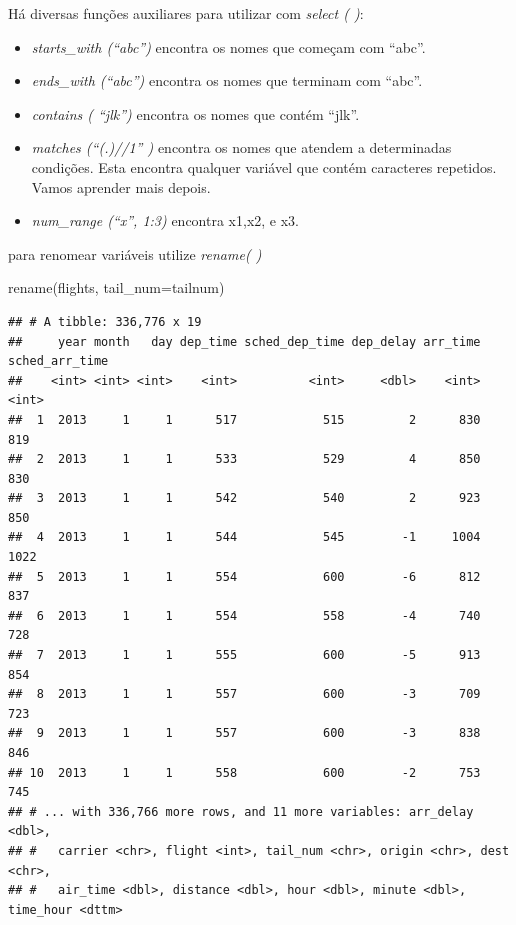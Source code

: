 \documentclass[
]{article}
\newenvironment{Shaded}{\begin{snugshade}}{\end{snugshade}}
\newcommand{\AttributeTok}[1]{\textcolor[rgb]{0.77,0.63,0.00}{#1}}
\newcommand{\FunctionTok}[1]{\textcolor[rgb]{0.00,0.00,0.00}{#1}}
\newcommand{\NormalTok}[1]{#1}
\begin{document}
Há diversas funções auxiliares para utilizar com \emph{select ( )}:

\begin{itemize}
\item
  \emph{starts\_with (``abc'')} encontra os nomes que começam com
  ``abc''.
\item
  \emph{ends\_with (``abc'')} encontra os nomes que terminam com
  ``abc''.
\item
  \emph{contains ( ``jlk'')} encontra os nomes que contém ``jlk''.
\item
  \emph{matches (``(.)//1'' )} encontra os nomes que atendem a
  determinadas condições. Esta encontra qualquer variável que contém
  caracteres repetidos. Vamos aprender mais depois.
\item
  \emph{num\_range (``x'', 1:3)} encontra x1,x2, e x3.
\end{itemize}

para renomear variáveis utilize \emph{rename( )}

\begin{Shaded}
\begin{Highlighting}[]
\FunctionTok{rename}\NormalTok{(flights, }\AttributeTok{tail\_num=}\NormalTok{tailnum)}
\end{Highlighting}
\end{Shaded}

\begin{verbatim}
## # A tibble: 336,776 x 19
##     year month   day dep_time sched_dep_time dep_delay arr_time sched_arr_time
##    <int> <int> <int>    <int>          <int>     <dbl>    <int>          <int>
##  1  2013     1     1      517            515         2      830            819
##  2  2013     1     1      533            529         4      850            830
##  3  2013     1     1      542            540         2      923            850
##  4  2013     1     1      544            545        -1     1004           1022
##  5  2013     1     1      554            600        -6      812            837
##  6  2013     1     1      554            558        -4      740            728
##  7  2013     1     1      555            600        -5      913            854
##  8  2013     1     1      557            600        -3      709            723
##  9  2013     1     1      557            600        -3      838            846
## 10  2013     1     1      558            600        -2      753            745
## # ... with 336,766 more rows, and 11 more variables: arr_delay <dbl>,
## #   carrier <chr>, flight <int>, tail_num <chr>, origin <chr>, dest <chr>,
## #   air_time <dbl>, distance <dbl>, hour <dbl>, minute <dbl>, time_hour <dttm>
\end{verbatim}
\end{document}
